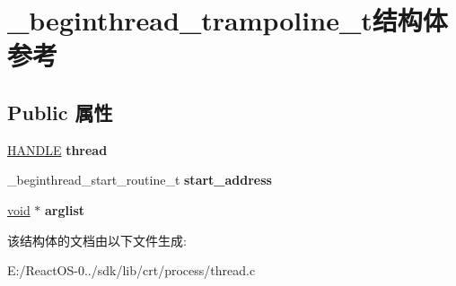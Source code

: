 \hypertarget{struct__beginthread__trampoline__t}{}\section{\+\_\+beginthread\+\_\+trampoline\+\_\+t结构体 参考}
\label{struct__beginthread__trampoline__t}
\subsection*{Public 属性}
\begin{DoxyCompactItemize}
\item 
\mbox{\label{struct__beginthread__trampoline__t_afaad6994abf8ddc3f5e32755cbd13abc}} 
\hyperlink{interfacevoid}{H\+A\+N\+D\+LE} {\bfseries thread}
\item 
\mbox{\label{struct__beginthread__trampoline__t_a6eeca60bbf0ba9af81f1f023ac2b3aa5}} 
\+\_\+beginthread\+\_\+start\+\_\+routine\+\_\+t {\bfseries start\+\_\+address}
\item 
\mbox{\label{struct__beginthread__trampoline__t_aaef1c64cb5385040b46dd60fec1fc2a6}} 
\hyperlink{interfacevoid}{void} $\ast$ {\bfseries arglist}
\end{DoxyCompactItemize}


该结构体的文档由以下文件生成\+:\begin{DoxyCompactItemize}
\item 
E\+:/\+React\+O\+S-\/0../sdk/lib/crt/process/thread.\+c\end{DoxyCompactItemize}
